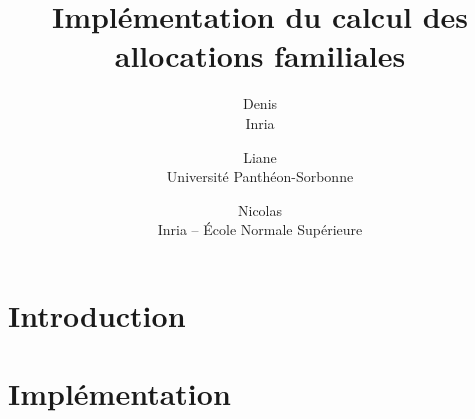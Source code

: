 \documentclass[11pt, french, a4paper]{article}
\title{Implémentation du calcul des allocations familiales}
\author{
  Denis \bsc{Merigoux}\\Inria\and
  Liane \bsc{Huttner}\\Université Panthéon-Sorbonne\and
  Nicolas \bsc{Chataing}\\Inria -- École Normale Supérieure\and
}
\begin{document}
\maketitle

\section{Introduction}

\section{Implémentation}


\end{document}
